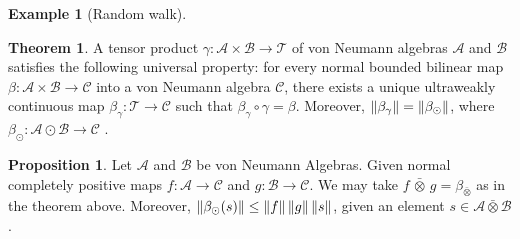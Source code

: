 \documentclass[10pt,a4paper]{amsart}
\theoremstyle{definition}
\theoremstyle{definition}
\newtheorem{example}[definition]{Example}
\theoremstyle{definition}
\newtheorem{lemma}[definition]{Lemma}
\theoremstyle{definition}
\newtheorem{proposition}[definition]{Proposition}
\theoremstyle{definition}
\theoremstyle{definition}
\newtheorem{theorem}[definition]{Theorem}
\begin{document}
\begin{example}[Random walk]
\begin{comment}
\begin{lemma} \cite[p.19]{pisierIntroductionOperatorSpace2003} \label{lem:cb_comp_submult}
  Given completely bounded maps $\phi: B (\mathcal{H}) \to B (\mathcal{K}) $ and $\psi: B (\mathcal{K}) \to B (\mathcal{L})$, it holds that
  $$ \cbnorm{\psi \cdot \phi} \leq \cbnorm{\psi} \cdot \cbnorm{\phi}  $$
\end{lemma}

\begin{proposition} \label{prop:dirsum_cb} \cite[Exercise 2.1.3.]{pisierIntroductionOperatorSpace2003}
  Let $\mathcal{H}_1, \mathcal{H}_2,  \mathcal{K} $ be Hilbert spaces.   Consider $\phi_i \in CB(B(\mathcal{K}), B(\mathcal{H}_i))$ ($i = 1,2$), and let $\phi \in 
  CB(B(\mathcal{K}), B(\mathcal{H}_1 \oplus  \mathcal{H}_2))$ be defined by $\phi(x) = (\phi_1(x),  \phi_2(x))$. It holds that 
  $$\cbnorm{\phi} = \max \{ \phi_1, \phi_2 \}.$$
\end{proposition}
\end{comment}

\begin{theorem} \cite[Theorem 112 XI]{westerbaanCategoryNeumannAlgebras2019} \label{thm:beta_alg_eq_beta_gamma}
A tensor product $\gamma\colon \mathcal{A} \times \mathcal{B} \to \mathcal{T}$ of von Neumann algebras $\mathcal{A}$ and $\mathcal{B}$ satisfies the following universal property: for every normal bounded bilinear map $\beta\colon  \mathcal{A} \times  \mathcal{B} \to \mathcal{C}$ into a von Neumann algebra $\mathcal{C}$, there exists a unique ultraweakly continuous map $\beta_\gamma\colon \mathcal{T} \to \mathcal{C}$ such that $\beta_\gamma \circ \gamma = \beta$. Moreover, $ \left\lVert \beta_\gamma \right\rVert = \left\lVert \beta_\odot \right\rVert$, where $
\beta_\odot\colon  \mathcal{A} \odot  \mathcal{B} \to \mathcal{C} 
$ .
\end{theorem}

\begin{proposition} \cite[Proof 115 III] {westerbaanCategoryNeumannAlgebras2019} \label{prop:norm_beta_alg}
  Let  $\mathcal{A}$ and $\mathcal{B}$ be von Neumann Algebras.
  Given normal completely positive maps $f:\mathcal{A} \to \mathcal{C}$ and $g:\mathcal{B} \to \mathcal{C}$. We may take $ f \, \bar{\otimes} \, g = \beta_{\bar{\otimes}}$ as in the theorem above. Moreover, $\left\lVert \beta_\odot(s) \right\rVert \leq \left\lVert f \right\rVert\left\lVert g \right\rVert\left\lVert s \right\rVert$, given an element $s\in \mathcal{A} \bar{\otimes} \mathcal{B}$.
\end{proposition}


\begin{comment}


\end{comment}
\end{example}
\end{document}
